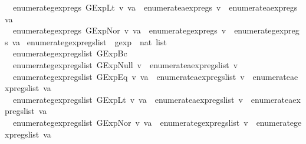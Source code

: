 \begin{isabellebody}
\ \ {\isachardoublequoteopen}enumerate{\isacharunderscore}gexp{\isacharunderscore}regs\ {\isacharparenleft}GExp{\isachardot}Lt\ v\ va{\isacharparenright}\ {\isacharequal}\ enumerate{\isacharunderscore}aexp{\isacharunderscore}regs\ v\ {\isasymunion}\ enumerate{\isacharunderscore}aexp{\isacharunderscore}regs\ va{\isachardoublequoteclose}\ {\isacharbar}\isanewline
\ \ {\isachardoublequoteopen}enumerate{\isacharunderscore}gexp{\isacharunderscore}regs\ {\isacharparenleft}GExp{\isachardot}Nor\ v\ va{\isacharparenright}\ {\isacharequal}\ enumerate{\isacharunderscore}gexp{\isacharunderscore}regs\ v\ {\isasymunion}\ enumerate{\isacharunderscore}gexp{\isacharunderscore}regs\ va{\isachardoublequoteclose}\isanewline
\isanewline
{}\isamarkupfalse%
\ enumerate{\isacharunderscore}gexp{\isacharunderscore}regs{\isacharunderscore}list\ {\isacharcolon}{\isacharcolon}\ {\isachardoublequoteopen}gexp\ {\isasymRightarrow}\ nat\ list{\isachardoublequoteclose}\ \isanewline
\ \ {\isachardoublequoteopen}enumerate{\isacharunderscore}gexp{\isacharunderscore}regs{\isacharunderscore}list\ {\isacharparenleft}GExp{\isachardot}Bc\ {\isacharunderscore}{\isacharparenright}\ {\isacharequal}\ {\isacharbrackleft}{\isacharbrackright}{\isachardoublequoteclose}\ {\isacharbar}\isanewline
\ \ {\isachardoublequoteopen}enumerate{\isacharunderscore}gexp{\isacharunderscore}regs{\isacharunderscore}list\ {\isacharparenleft}GExp{\isachardot}Null\ v{\isacharparenright}\ {\isacharequal}\ enumerate{\isacharunderscore}aexp{\isacharunderscore}regs{\isacharunderscore}list\ v{\isachardoublequoteclose}\ {\isacharbar}\isanewline
\ \ {\isachardoublequoteopen}enumerate{\isacharunderscore}gexp{\isacharunderscore}regs{\isacharunderscore}list\ {\isacharparenleft}GExp{\isachardot}Eq\ v\ va{\isacharparenright}\ {\isacharequal}\ enumerate{\isacharunderscore}aexp{\isacharunderscore}regs{\isacharunderscore}list\ v\ {\isacharat}\ enumerate{\isacharunderscore}aexp{\isacharunderscore}regs{\isacharunderscore}list\ va{\isachardoublequoteclose}\ {\isacharbar}\isanewline
\ \ {\isachardoublequoteopen}enumerate{\isacharunderscore}gexp{\isacharunderscore}regs{\isacharunderscore}list\ {\isacharparenleft}GExp{\isachardot}Lt\ v\ va{\isacharparenright}\ {\isacharequal}\ enumerate{\isacharunderscore}aexp{\isacharunderscore}regs{\isacharunderscore}list\ v\ {\isacharat}\ enumerate{\isacharunderscore}aexp{\isacharunderscore}regs{\isacharunderscore}list\ va{\isachardoublequoteclose}\ {\isacharbar}\isanewline
\ \ {\isachardoublequoteopen}enumerate{\isacharunderscore}gexp{\isacharunderscore}regs{\isacharunderscore}list\ {\isacharparenleft}GExp{\isachardot}Nor\ v\ va{\isacharparenright}\ {\isacharequal}\ enumerate{\isacharunderscore}gexp{\isacharunderscore}regs{\isacharunderscore}list\ v\ {\isacharat}\ enumerate{\isacharunderscore}gexp{\isacharunderscore}regs{\isacharunderscore}list\ va{\isachardoublequoteclose}\isanewline

\end{isabellebody}
